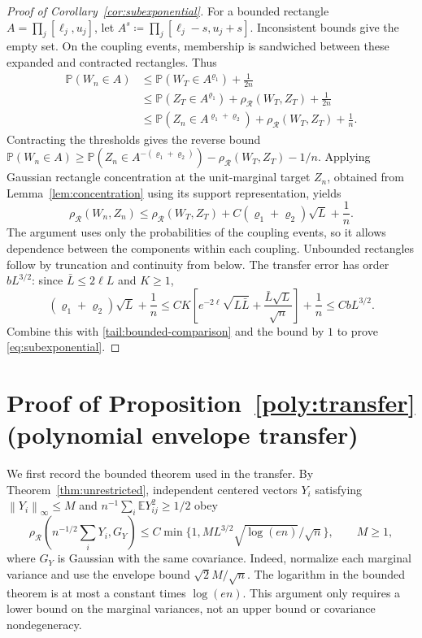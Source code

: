 \documentclass[11pt,letterpaper]{article}
\theoremstyle{remark}
\newcommand{\E}{\mathbb E}
\newcommand{\Pp}{\mathbb P}
\newcommand{\norm}[1]{\left\lVert#1\right\rVert}
\newcommand{\rh}{\rho_{\mathcal R}}
\begin{document}
\begin{proof}[Proof of Corollary~\ref{cor:subexponential}]
For a bounded rectangle \(A=\prod_j[\ell_j,u_j]\), let
\(A^s\coloneqq\prod_j[\ell_j-s,u_j+s]\). Inconsistent bounds
give the empty set. On the coupling events, membership is sandwiched
between these expanded and contracted rectangles. Thus
\begin{align*}
 \Pp(W_n\in A)
 &\le\Pp(W_T\in A^{\varrho_1})+\frac1{2n}\\
 &\le\Pp(Z_T\in A^{\varrho_1})+\rh(W_T,Z_T)+\frac1{2n}\\
 &\le\Pp(Z_n\in A^{\varrho_1+\varrho_2})+\rh(W_T,Z_T)+\frac1n.
\end{align*}
Contracting the thresholds gives the reverse bound
\(\Pp(W_n\in A)\ge\Pp(Z_n\in A^{-(\varrho_1+\varrho_2)})
-\rh(W_T,Z_T)-1/n\). Applying Gaussian rectangle concentration at
the unit-marginal target \(Z_n\), obtained from Lemma~\ref{lem:concentration}
using its support representation, yields
\begin{equation}
 \rh(W_n,Z_n)\le\rh(W_T,Z_T)
       +C(\varrho_1+\varrho_2)\sqrt L+\frac1n.
 \label{tail:transfer}
\end{equation}
The argument uses only the probabilities of the coupling events,
so it allows dependence between the components within each coupling. Unbounded
rectangles follow by truncation and continuity from below.
The transfer error has order \(bL^{3/2}\): since
\(\bar L\le2\ell L\) and \(K\ge1\),
\[
 (\varrho_1+\varrho_2)\sqrt L+\frac1n
 \le CK\left[e^{-2\ell}\sqrt{L\bar L}
                     +\frac{\bar L\sqrt L}{\sqrt n}\right]+\frac1n
 \le CbL^{3/2}.
\]
Combine this with \eqref{tail:bounded-comparison} and the bound by \(1\)
to prove \eqref{eq:subexponential}.

\end{proof}

\section{Proof of Proposition~\ref*{poly:transfer} (polynomial envelope transfer)}\label{app:conditional}

We first record the bounded theorem used in the transfer. By Theorem~\ref{thm:unrestricted}, independent
centered vectors \(Y_i\) satisfying \(\norm{Y_i}_\infty\le M\)
and \(n^{-1}\sum_i\E Y_{ij}^2\ge1/2\) obey
\begin{equation}
 \rh\left(n^{-1/2}\sum_iY_i,G_Y\right)
 \le C\min\{1,ML^{3/2}\sqrt{\log(en)}/\sqrt n\},\qquad M\ge1,
 \label{app:bounded-input}
\end{equation}
where \(G_Y\) is Gaussian with the same covariance. Indeed, normalize
each marginal variance and use the envelope bound \(\sqrt2 M/\sqrt n\).
The logarithm in the bounded theorem is at most a constant times
\(\log(en)\). This argument only requires a lower bound on the marginal
variances, not an upper bound or covariance nondegeneracy.
\end{document}
